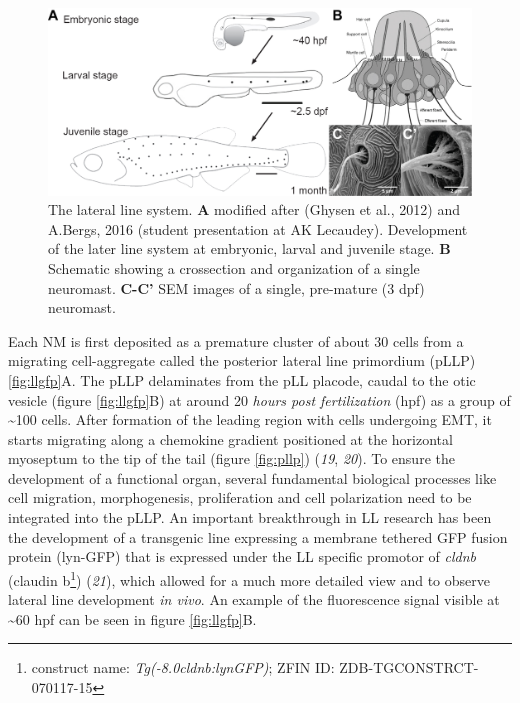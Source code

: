 \documentclass[11pt,singlespacinge,twoside]{reedthesis} %
\begin{document}
\begin{figure}

{\centering \includegraphics[width=.95\textwidth]{figures/intro/ll_system} 

}

\caption[The lateral line system]{The lateral line system. \textbf{A} modified after (Ghysen et al., 2012) and A.Bergs, 2016 (student presentation at AK Lecaudey). Development of the later line system at embryonic, larval and juvenile stage. \textbf{B} Schematic showing a crossection and organization of a single neuromast. \textbf{C-C'} SEM images of a single, pre-mature (3 dpf) neuromast.}\label{fig:llsystem}
\end{figure}
Each NM is first deposited as a premature cluster of about 30 cells from a migrating cell-aggregate called the posterior lateral line primordium (pLLP) \ref{fig:llgfp}A. The pLLP delaminates from the pLL placode, caudal to the otic vesicle (figure \ref{fig:llgfp}B) at around 20 \emph{hours post fertilization} (hpf) as a group of \textasciitilde{}100 cells. After formation of the leading region with cells undergoing EMT, it starts migrating along a chemokine gradient positioned at the horizontal myoseptum to the tip of the tail (figure \ref{fig:pllp}) (\emph{19}, \emph{20}). To ensure the development of a functional organ, several fundamental biological processes like cell migration, morphogenesis, proliferation and cell polarization need to be integrated into the pLLP.
An important breakthrough in LL research has been the development of a transgenic line expressing a membrane tethered GFP fusion protein (lyn-GFP) that is expressed under the LL specific promotor of \emph{cldnb} (claudin b\footnote{construct name: \emph{Tg(-8.0cldnb:lynGFP)}; ZFIN ID: ZDB-TGCONSTRCT-070117-15}) (\emph{21}), which allowed for a much more detailed view and to observe lateral line development \emph{in vivo}. An example of the fluorescence signal visible at \textasciitilde{}60 hpf can be seen in figure \ref{fig:llgfp}B.
\end{document}
